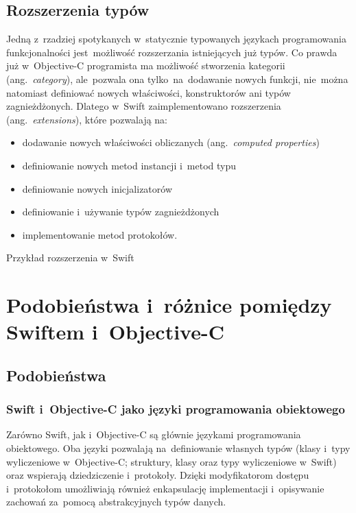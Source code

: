 \documentclass[mgr, shortabstract]{iithesis}
\newcommand{\ang}[1]{ang.~\textit{#1}}
\newcommand{\swiftlisting}[2]{
    \swiftcode{src/#1.swift}
    \begin{listing}[ht]
      \caption{#2}
      \label{l:#1}
    \end{listing}
}
\begin{document}
\section{Rozszerzenia typów}
\label{s:rozszerzenia_typow}

Jedną z~rzadziej spotykanych w~statycznie typowanych językach programowania funkcjonalności jest~możliwość rozszerzania istniejących już typów. Co prawda już w~Objective-C programista ma możliwość stworzenia kategorii (\ang{category}), ale~pozwala ona tylko~na~dodawanie nowych funkcji, nie~można natomiast definiować nowych właściwości, konstruktorów ani typów zagnieżdżonych. Dlatego w~Swift zaimplementowano rozszerzenia (\ang{extensions}), które pozwalają na:

\begin{itemize}
    \item dodawanie nowych właściwości obliczanych (\ang{computed properties})
    \item definiowanie nowych metod instancji i~metod typu
    \item definiowanie nowych inicjalizatorów
    \item definiowanie i~używanie typów zagnieżdżonych
    \item implementowanie metod protokołów.
\end{itemize}

\swiftlisting{2_extension}{Przykład rozszerzenia w~Swift}

\chapter{Podobieństwa i~różnice pomiędzy Swiftem i~Objective-C}

\label{ch:swift-objc}

\section{Podobieństwa}

\subsection{Swift i~Objective-C jako języki programowania obiektowego}

Zarówno Swift, jak i~Objective-C są głównie językami programowania  obiektowego. Oba języki pozwalają na~definiowanie własnych typów (klasy i~typy wyliczeniowe w~Objective-C; struktury, klasy oraz typy wyliczeniowe w~Swift) oraz wspierają dziedziczenie i~protokoły. Dzięki modyfikatorom dostępu i~protokołom umożliwiają również enkapsulację implementacji i~opisywanie zachowań za~pomocą abstrakcyjnych typów danych.
\end{document}
